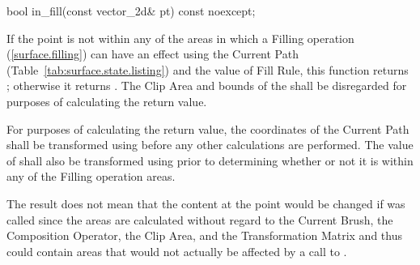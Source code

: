 \begin{itemdecl}
bool in_fill(const vector_2d& pt) const noexcept;
\end{itemdecl}
\begin{itemdescr}
\pnum
\returns
If the point  is not within any of the areas in which a Filling operation (\ref{surface.filling}) can have an effect using the Current Path (Table~\ref{tab:surface.state.listing}) and the value of Fill Rule, this function returns ; otherwise it returns . The Clip Area and bounds of the \underlyingsurface shall be disregarded for purposes of calculating the return value.

\pnum
For purposes of calculating the return value, the coordinates of the Current Path shall be transformed using  before any other calculations are performed. The value of  shall also be transformed using  prior to determining whether or not it is within any of the Filling operation areas.

\pnum
\realnotes
The result does not mean that the content at the point  would be changed if  was called since the areas are calculated without regard to the Current Brush, the Composition Operator, the Clip Area, and the Transformation Matrix and thus could contain areas that would not actually be affected by a call to .
\end{itemdescr}

